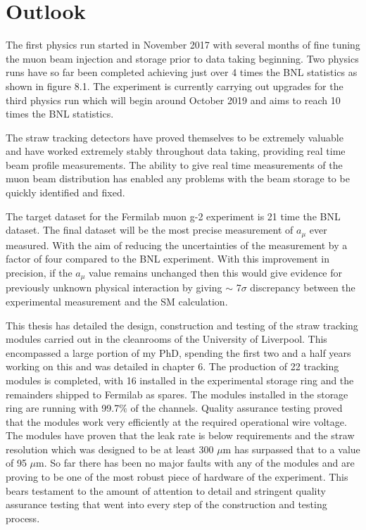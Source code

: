 \label{Chapter7} %
\chapter{Outlook} %


The first physics run started in November 2017 with several months of fine tuning the muon beam injection and storage prior to data taking beginning. Two physics runs have so far been completed achieving just over 4 times the BNL statistics as shown in figure 8.1. The experiment is currently carrying out upgrades for the third physics run which will begin around October 2019 and aims to reach 10 times the BNL statistics. 

The straw tracking detectors have proved themselves to be extremely valuable and have worked extremely stably throughout data taking, providing real time beam profile measurements. The ability to give real time measurements of the muon beam distribution has enabled any problems with the beam storage to be quickly identified and fixed. 

The target dataset for the Fermilab muon g-2 experiment is 21 time the BNL dataset. The final dataset will be the most precise measurement of $a_{\mu}$ ever measured. With the aim of reducing the uncertainties of the measurement by a factor of four compared to the BNL experiment. With this improvement in precision, if the $a_{\mu}$ value remains unchanged then this would give evidence for previously unknown physical interaction by giving $\sim$ 7$\sigma$ discrepancy between the experimental measurement and the SM calculation.

This thesis has detailed the design, construction and testing of the straw tracking modules carried out in the cleanrooms of the University of Liverpool. This encompassed a large portion of my PhD, spending the first two and a half years working on this and was detailed in chapter 6. The production of 22 tracking modules is completed, with 16 installed in the experimental storage ring and the remainders shipped to Fermilab as spares. The modules installed in the storage ring are running with 99.7$\%$ of the channels. Quality assurance testing proved that the modules work very efficiently at the required operational wire voltage. The modules have proven that the leak rate is below requirements and the straw resolution which was designed to be at least 300 $\mu$m has surpassed that to a value of 95 $\mu$m. So far there has been no major faults with any of the modules and are proving to be one of the most robust piece of hardware of the experiment. This bears testament to the amount of attention to detail and stringent quality assurance testing that went into every step of the construction and testing process.

